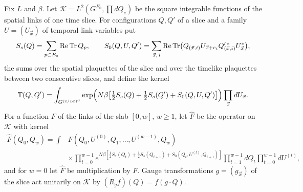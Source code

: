 Fix $L$ and $\beta$. Let $\mathcal K=L^2(G^{E_0},\prod dQ_e)$ be the square
integrable functions of the spatial links of one time slice. For
configurations $Q,Q'$ of a slice and a family $U=(U_{\vec x})$ of temporal
link variables put
\[
S_s(Q)=\sum_{p\subset E_0}\operatorname{Re}\operatorname{Tr} Q_p,\qquad
S_0(Q,U,Q')=\sum_{\vec x,\,i}\operatorname{Re}\operatorname{Tr}\bigl(Q_{(\vec x,i)}U_{\vec x+e_i}
Q'^{\,*}_{(\vec x,i)}U^*_{\vec x}\bigr),
\]
the sums over the spatial plaquettes of the slice and over the timelike
plaquettes between two consecutive slices, and define the kernel
\begin{equation}\label{eq:transferkernel}
\mathbb T(Q,Q')=\int_{G^{(\mathbb{Z}/L\mathbb{Z})^3}}\exp\Bigl(N\beta\bigl[\tfrac12S_s(Q)+\tfrac12S_s(Q')
+S_0(Q,U,Q')\bigr]\Bigr)\prod_{\vec x}dU_{\vec x}.
\end{equation}
For a function $F$ of the links of the slab $[0,w]$, $w\ge1$, let $\hat F$
be the operator on $\mathcal K$ with kernel
\begin{equation}\label{eq:slabkernel}
\begin{aligned}
\hat F(Q_0,Q_w)=\int&F(Q_0,U^{(0)},Q_1,\dots,U^{(w-1)},Q_w)\\
&\times\prod_{t=0}^{w-1}e^{N\beta[\frac12S_s(Q_t)+\frac12S_s(Q_{t+1})+S_0(Q_t,U^{(t)},Q_{t+1})]}
\prod_{t=1}^{w-1}dQ_t\prod_{t=0}^{w-1}dU^{(t)},
\end{aligned}
\end{equation}
and for $w=0$ let $\hat F$ be multiplication by $F$. Gauge transformations
$g=(g_{\vec x})$ of the slice act unitarily on $\mathcal K$ by $(R_gf)(Q)=
f(g\cdot Q)$.

